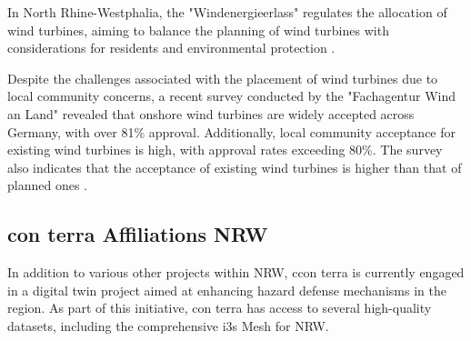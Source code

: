 \documentclass[11pt, titlepage, a4paper]{scrartcl}
\begin{document}
\begin{linenumbers}
    In North Rhine-Westphalia, the "Windenergieerlass" \cite{nrwErlassFurPlanung} regulates the allocation of wind turbines, aiming to balance the planning of wind turbines with considerations for residents and environmental protection \cite{fachagenturwindenergieanlandFachagenturWindenergieLand}.

    Despite the challenges associated with the placement of wind turbines due to local community concerns, a recent survey conducted by the "Fachagentur Wind an Land" revealed that onshore wind turbines are widely accepted across Germany, with over 81\% approval. Additionally, local community acceptance for existing wind turbines is high, with approval rates exceeding 80\%. The survey also indicates that the acceptance of existing wind turbines is higher than that of planned ones \cite{fachagenturwindenergieanlandUmfrageZurAkzeptanz}.

    \subsection{con terra Affiliations NRW}
    In addition to various other projects within NRW, ccon terra is currently engaged in a digital twin project aimed at enhancing hazard defense mechanisms in the region. As part of this initiative, con terra has access to several high-quality datasets, including the comprehensive i3s Mesh for NRW.



\end{linenumbers}
\end{document}
